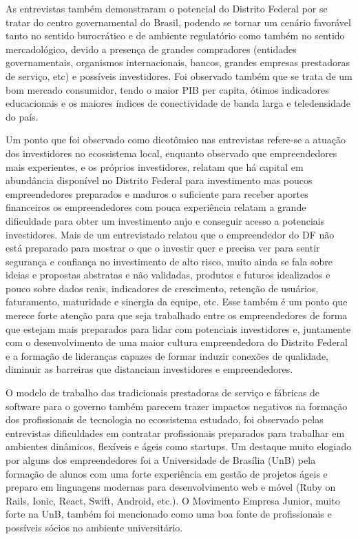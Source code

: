 As entrevistas também demonstraram o potencial do Distrito Federal por se tratar do centro governamental do Brasil, podendo se tornar um cenário favorável tanto no sentido burocrático e de ambiente regulatório como também no sentido mercadológico, devido a presença de grandes compradores (entidades governamentais, organismos internacionais, bancos, grandes empresas prestadoras de serviço, etc) e possíveis investidores. Foi observado também que se trata de um bom mercado consumidor, tendo o maior PIB per capita, ótimos indicadores educacionais e os maiores índices de conectividade de banda larga e teledensidade do país.

Um ponto que foi observado como dicotômico nas entrevistas refere-se a atuação dos investidores no ecossistema local, enquanto observado que empreendedores mais experientes, e os próprios investidores, relatam que há capital em abundância disponível no Distrito Federal para investimento mas poucos empreendedores preparados e maduros o suficiente para receber aportes financeiros os empreendedores com pouca experiência relatam a grande dificuldade para obter um investimento anjo e conseguir acesso a potenciais investidores. Mais de um entrevistado relatou que o empreendedor do DF não está preparado para mostrar o que o investir quer e precisa ver para sentir segurança e confiança no investimento de alto risco, muito ainda se fala sobre ideias e propostas abstratas e não validadas, produtos e futuros idealizados e pouco sobre dados reais, indicadores de crescimento, retenção de usuários, faturamento, maturidade e sinergia da equipe, etc. Esse também é um ponto que merece forte atenção para que seja trabalhado entre os empreendedores de forma que estejam mais preparados para lidar com potenciais investidores e, juntamente com o desenvolvimento de uma maior cultura empreendedora do Distrito Federal e a formação de lideranças capazes de formar induzir conexões de qualidade, diminuir as barreiras que distanciam investidores e empreendedores.

O modelo de trabalho das tradicionais prestadoras de serviço e fábricas de software para o governo também parecem trazer impactos negativos na formação dos profissionais de tecnologia no ecossistema estudado, foi observado pelas entrevistas dificuldades em contratar profissionais preparados para trabalhar em ambientes dinâmicos, flexíveis e ágeis como startups. Um destaque muito elogiado por alguns dos empreendedores foi a Universidade de Brasília (UnB) pela formação de alunos com uma forte experiência em gestão de projetos ágeis e preparo em linguagens modernas para desenvolvimento web e móvel (Ruby on Rails, Ionic, React, Swift, Android, etc.). O Movimento Empresa Junior, muito forte na UnB, também foi mencionado como uma boa fonte de profissionais e possíveis sócios no ambiente universitário.

